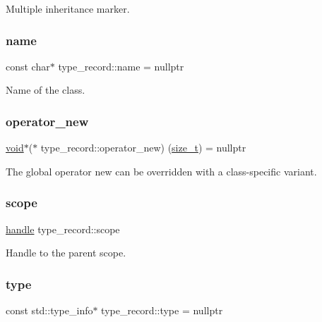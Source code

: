 Multiple inheritance marker. 

\mbox{\label{structtype__record_aaf93cf029bb1a9686fd5e72c16ea81a8}} 
\subsubsection{\texorpdfstring{name}{name}}
{\footnotesize\ttfamily const char$\ast$ type\+\_\+record\+::name = nullptr}



Name of the class. 

\mbox{\label{structtype__record_a9c77a43dea54c475eada38b5ded56a2e}} 
\subsubsection{\texorpdfstring{operator\_new}{operator\_new}}
{\footnotesize\ttfamily \mbox{\hyperlink{_s_d_l__opengles2__gl2ext_8h_ae5d8fa23ad07c48bb609509eae494c95}{void}}$\ast$($\ast$ type\+\_\+record\+::operator\+\_\+new) (\mbox{\hyperlink{detail_2common_8h_a801d6a451a01953ef8cbae6feb6a3638}{size\+\_\+t}}) = nullptr}



The global operator new can be overridden with a class-\/specific variant. 

\mbox{\label{structtype__record_ab188820ddf461b3b49818f34885c5687}} 
\subsubsection{\texorpdfstring{scope}{scope}}
{\footnotesize\ttfamily \mbox{\hyperlink{classhandle}{handle}} type\+\_\+record\+::scope}



Handle to the parent scope. 

\mbox{\label{structtype__record_a9b25042abe2522e477656878280c5368}} 
\subsubsection{\texorpdfstring{type}{type}}
{\footnotesize\ttfamily const std\+::type\+\_\+info$\ast$ type\+\_\+record\+::type = nullptr}

